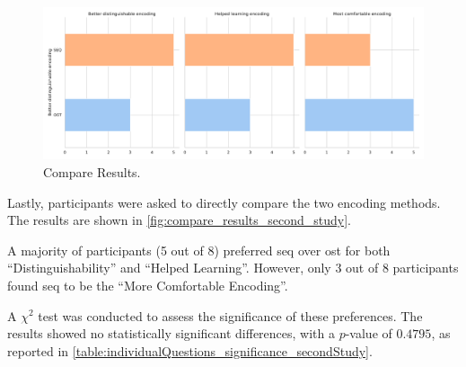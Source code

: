 \begin{figure}
    \centering
    \includegraphics[width=0.5\linewidth]{src/pictures/Study2Data_questionnaire/questions_special_study2.pdf}
    \caption{Compare Results.}
    \label{fig:compare_results_second_study}
\end{figure}
Lastly, participants were asked to directly compare the two encoding methods. The results are shown in \autoref{fig:compare_results_second_study}. 

A majority of participants (5 out of 8) preferred \gls{seq} over \gls{ost} for both \enquote{Distinguishability} and \enquote{Helped Learning}. However, only 3 out of 8 participants found \gls{seq} to be the \enquote{More Comfortable Encoding}.

A $\chi^2$ test was conducted to assess the significance of these preferences. The results showed no statistically significant differences, with a $p$-value of $0.4795$, as reported in \autoref{table:individualQuestions_significance_secondStudy}.


\begin{table}[ht]
\caption{Results of the Wilcoxon significance tests for the different self-assessment dimensions with a Cohens D Effect Size.}
\label{table:individualQuestions_significance_secondStudy}
\end{table}
